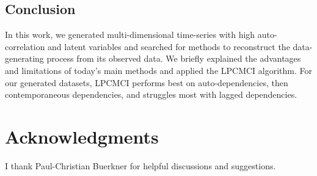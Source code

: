 \documentclass[conference]{IEEEtran}
\begin{document}
\subsection{Conclusion}
In this work, we generated multi-dimensional time-series with high auto-correlation and latent variables and searched for methods to reconstruct the data-generating process from its observed data.
We briefly explained the advantages and limitations of today's main methods and applied the LPCMCI algorithm.
For our generated datasets, LPCMCI performs best on auto-dependencies, then contemporaneous dependencies, and struggles most with lagged dependencies.

\section{Acknowledgments}
I thank Paul-Christian Buerkner for helpful discussions and suggestions.







\end{document}
